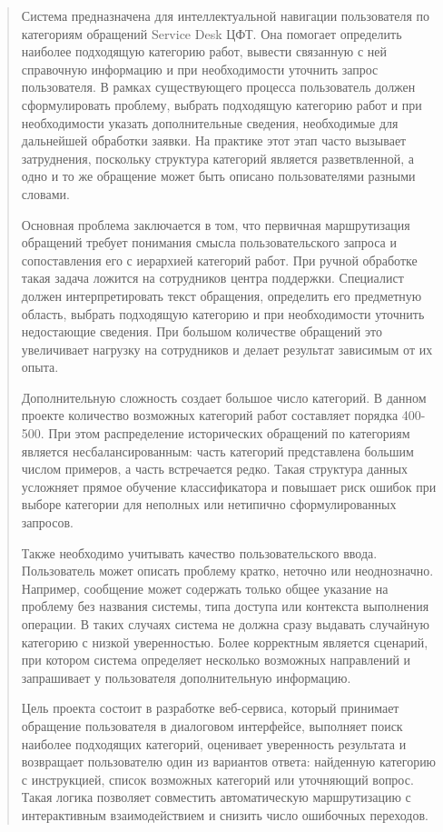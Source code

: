 \begin{quote}
Система предназначена для интеллектуальной навигации пользователя по
категориям обращений Service Desk ЦФТ. Она помогает определить наиболее
подходящую категорию работ, вывести связанную с ней справочную
информацию и при необходимости уточнить запрос пользователя. В рамках
существующего процесса пользователь должен сформулировать проблему,
выбрать подходящую категорию работ и при необходимости указать
дополнительные сведения, необходимые для дальнейшей обработки заявки. На
практике этот этап часто вызывает затруднения, поскольку структура
категорий является разветвленной, а одно и то же обращение может быть
описано пользователями разными словами.

Основная проблема заключается в том, что первичная маршрутизация
обращений требует понимания смысла пользовательского запроса и
сопоставления его с иерархией категорий работ. При ручной обработке
такая задача ложится на сотрудников центра поддержки. Специалист должен
интерпретировать текст обращения, определить его предметную область,
выбрать подходящую категорию и при необходимости уточнить недостающие
сведения. При большом количестве обращений это увеличивает нагрузку на
сотрудников и делает результат зависимым от их опыта.

Дополнительную сложность создает большое число категорий. В данном
проекте количество возможных категорий работ составляет порядка 400-500.
При этом распределение исторических обращений по категориям является
несбалансированным: часть категорий представлена большим числом
примеров, а часть встречается редко. Такая структура данных усложняет
прямое обучение классификатора и повышает риск ошибок при выборе
категории для неполных или нетипично сформулированных запросов.

Также необходимо учитывать качество пользовательского ввода.
Пользователь может описать проблему кратко, неточно или неоднозначно.
Например, сообщение может содержать только общее указание на проблему
без названия системы, типа доступа или контекста выполнения операции. В
таких случаях система не должна сразу выдавать случайную категорию с
низкой уверенностью. Более корректным является сценарий, при котором
система определяет несколько возможных направлений и запрашивает у
пользователя дополнительную информацию.

Цель проекта состоит в разработке веб-сервиса, который принимает
обращение пользователя в диалоговом интерфейсе, выполняет поиск наиболее
подходящих категорий, оценивает уверенность результата и возвращает
пользователю один из вариантов ответа: найденную категорию с
инструкцией, список возможных категорий или уточняющий вопрос. Такая
логика позволяет совместить автоматическую маршрутизацию с интерактивным
взаимодействием и снизить число ошибочных переходов.


\end{quote}
